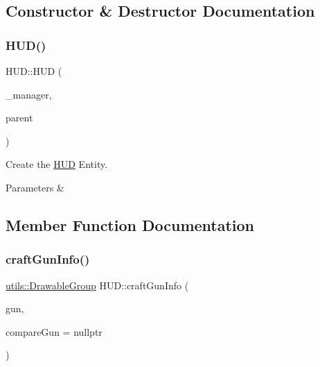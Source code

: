 \subsection{Constructor \& Destructor Documentation}
\mbox{\label{class_h_u_d_a8f9d329a1d1ea7aa3ef5d58265835468}} 
\subsubsection{\texorpdfstring{HUD()}{HUD()}}
{\footnotesize\ttfamily H\+U\+D\+::\+H\+UD (\begin{DoxyParamCaption}\item[{\mbox{\hyperlink{class_game_manager}{Game\+Manager}} $\ast$}]{\+\_\+manager,  }\item[{\mbox{\hyperlink{class_game_entity}{Game\+Entity}} $\ast$}]{parent }\end{DoxyParamCaption})}



Create the \mbox{\hyperlink{class_h_u_d}{H\+UD}} Entity. 


\begin{DoxyParams}{Parameters}
{\em } & \\
\hline
\end{DoxyParams}


\subsection{Member Function Documentation}
\mbox{\label{class_h_u_d_aeaf2249ff2831b5083f9b87129038d9c}} 
\subsubsection{\texorpdfstring{craftGunInfo()}{craftGunInfo()}}
{\footnotesize\ttfamily \mbox{\hyperlink{structutils_1_1_drawable_group}{utils\+::\+Drawable\+Group}} H\+U\+D\+::craft\+Gun\+Info (\begin{DoxyParamCaption}\item[{\mbox{\hyperlink{class_gun}{Gun}} $\ast$}]{gun,  }\item[{\mbox{\hyperlink{class_gun}{Gun}} $\ast$}]{compare\+Gun = {\ttfamily nullptr} }\end{DoxyParamCaption})\hspace{0.3cm}{\ttfamily [static]}}



